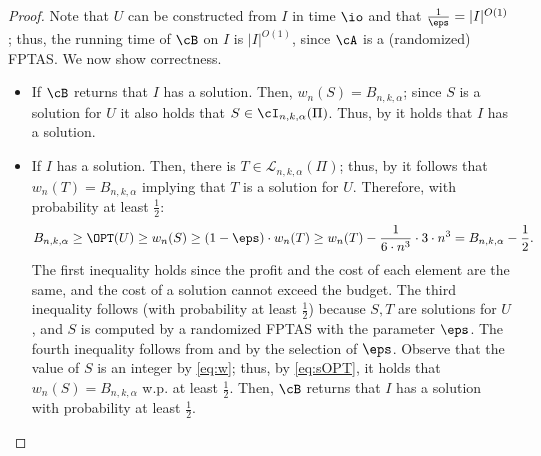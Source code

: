 \begin{proof}
	Note that $U$ can be constructed from $I$ in time $\io$ and that $\frac{1}{\eps} = |I|^{O(1)}$; thus, the running time of $\cB$ on $I$ is $|I|^{O(1)}$, since $\cA$ is a (randomized) FPTAS. We now show correctness. %
	\begin{itemize}
		\item If $\cB$ returns that $I$ has a solution. Then, $w_n(S) = B_{n,k,\alpha}$; since $S$ is a solution for $U$ it also holds that $S \in \cI_{n,k,\alpha}(\Pi)$. Thus, by  it holds that $I$ has a solution.  
		\item If $I$ has a solution. Then, there is $T \in \mathcal{L}_{n,k,\alpha}(\Pi)$; thus, by   it follows that $w_n(T) = B_{n,k,\alpha}$ implying that $T$ is a solution for $U$.  Therefore, with probability at least $\frac{1}{2}$: 
		 \begin{equation}
			\label{eq:sOPT}
			B_{n,k,\alpha} \geq \OPT(U) \geq w_n(S) \geq (1-\eps) \cdot w_n(T) \geq  w_n(T)-\frac{1}{6 \cdot n^3} \cdot 3 \cdot n^3 = B_{n,k,\alpha}-\frac{1}{2}.
		\end{equation} 	The first inequality holds since %
	the profit and the cost of each element are the same, and the cost of a solution cannot exceed the budget. The third inequality follows (with probability at least $\frac{1}{2}$) because $S,T$ are solutions for $U$, and $S$ is computed by a randomized FPTAS with the parameter $\eps$. The fourth inequality follows from  and by the selection of $\eps$. Observe that the value of $S$ is an integer by \eqref{eq:w}; thus, by \eqref{eq:sOPT}, %
it holds that $w_n(S) = B_{n,k,\alpha}$ w.p. at least $\frac{1}{2}$. Then, $\cB$ returns that $I$ has a solution with probability at least $\frac{1}{2}$.  
	\end{itemize}

	
	

\end{proof}
